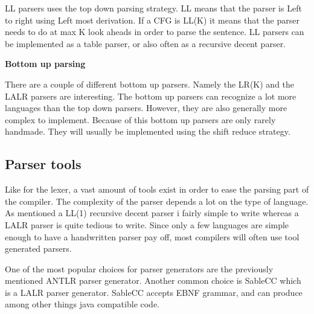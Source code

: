 LL parsers uses the top down parsing strategy. 
LL means that the parser is Left to right using Left most derivation. 
If a CFG is LL(K) it means that the parser needs to do at max K look aheads in order to parse the sentence. 
LL parsers can be implemented as a table parser, or also often as a recursive decent parser. 

\textbf{Bottom up parsing}

There are a couple of different bottom up parsers. 
Namely the LR(K) and the LALR parsers are interesting. 
The bottom up parsers can recognize a lot more languages than the top down parsers.
However, they are also generally more complex to implement.
Because of this bottom up parsers are only rarely handmade.
They will usually be implemented using the shift reduce strategy.


\subsection{Parser tools}

Like for the lexer, a vast amount of tools exist in order to ease the parsing part of the compiler. 
The complexity of the parser depends a lot on the type of language. 
As mentioned a LL(1) recursive decent parser i fairly simple to write whereas a LALR parser is quite tedious to write. 
Since only a few languages are simple enough to have a handwritten parser pay off, most compilers will often use tool generated parsers.

One of the most popular choices for parser generators are the previously mentioned ANTLR parser generator. 
Another common choice is SableCC which is a LALR parser generator.
SableCC accepts EBNF grammar, and can produce among other things java compatible code.